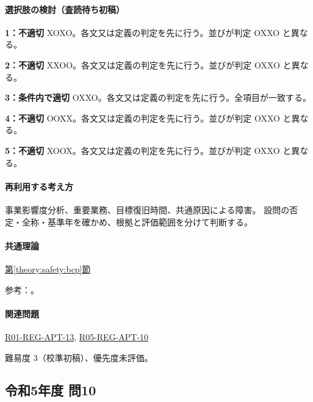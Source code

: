 \paragraph{選択肢の検討（査読待ち初稿）}\mbox{}\par

\noindent\textbf{1：不適切} XOXO。各文又は定義の判定を先に行う。並びが判定 OXXO と異なる。\par

\noindent\textbf{2：不適切} XXOO。各文又は定義の判定を先に行う。並びが判定 OXXO と異なる。\par

\noindent\textbf{3：条件内で適切} OXXO。各文又は定義の判定を先に行う。全項目が一致する。\par

\noindent\textbf{4：不適切} OOXX。各文又は定義の判定を先に行う。並びが判定 OXXO と異なる。\par

\noindent\textbf{5：不適切} XOOX。各文又は定義の判定を先に行う。並びが判定 OXXO と異なる。\par

\paragraph{再利用する考え方} 事業影響度分析、重要業務、目標復旧時間、共通原因による障害。 設問の否定・全称・基準年を確かめ、根拠と評価範囲を分けて判断する。

\paragraph{共通理論} \hyperref[theory:safety:bcp]{第\ref*{theory:safety:bcp}節}

\par 参考：\cite{eth54_bcp2013}。

\paragraph{関連問題} \hyperref[q:r01-reg-apt-13]{R01-REG-APT-13}, \hyperref[q:r05-reg-apt-10]{R05-REG-APT-10}

\par 難易度 3（校準初稿）、優先度未評価。

\subsection{令和5年度 問10}
\label{q:r05-reg-apt-10}

